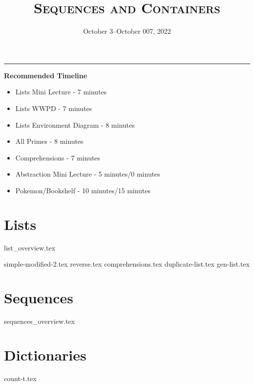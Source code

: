 \documentclass{exam}
\title{\textsc{Sequences and Containers}}
\date{October 3--October 007, 2022}
\begin{document}
\maketitle
\rule{\textwidth}{0.15em}
\fontsize{12}{15}\selectfont


\begin{guide}
    \textbf{Recommended Timeline}
    \begin{itemize}
        \item Lists Mini Lecture - 7 minutes
        \item Lists WWPD - 7 minutes
        \item Lists Environment Diagram - 8 minutes
        \item All Primes - 8 minutes
        \item Comprehensions - 7 minutes
        \item Abstraction Mini Lecture - 5 minutes/0 minutes
        \item Pokemon/Bookshelf - 10 minutes/15 minutes
    \end{itemize}
\end{guide}

\section{Lists}
{list_overview.tex}
\begin{questions}
    {simple-modified-2.tex}
    {reverse.tex}
    \newpage %
    {comprehensions.tex}
    {duplicate-list.tex}
    {gen-list.tex}

\end{questions}

\newpage
\section{Sequences}
{sequences_overview.tex}


\newpage

\newpage
\section{Dictionaries}
\begin{questions}
    {count-t.tex}
    
\end{questions}
\end{document}
